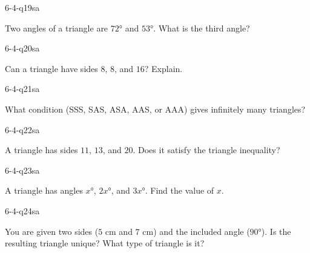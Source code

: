 
\begin{practiceQuestion}{6-4-q19}{sa}
\begin{questionText}
Two angles of a triangle are $72°$ and $53°$. What is the third angle?
\end{questionText}
\end{practiceQuestion}

\begin{practiceQuestion}{6-4-q20}{sa}
\begin{questionText}
Can a triangle have sides $8$, $8$, and $16$? Explain.
\end{questionText}
\end{practiceQuestion}

\begin{practiceQuestion}{6-4-q21}{sa}
\begin{questionText}
What condition (SSS, SAS, ASA, AAS, or AAA) gives infinitely many triangles?
\end{questionText}
\end{practiceQuestion}

\begin{practiceQuestion}{6-4-q22}{sa}
\begin{questionText}
A triangle has sides $11$, $13$, and $20$. Does it satisfy the triangle inequality?
\end{questionText}
\end{practiceQuestion}

\begin{practiceQuestion}{6-4-q23}{sa}
\begin{questionText}
A triangle has angles $x°$, $2x°$, and $3x°$. Find the value of $x$.
\end{questionText}
\end{practiceQuestion}

\begin{practiceQuestion}{6-4-q24}{sa}
\begin{questionText}
You are given two sides ($5$ cm and $7$ cm) and the included angle ($90°$). Is the resulting triangle unique? What type of triangle is it?
\end{questionText}
\end{practiceQuestion}

